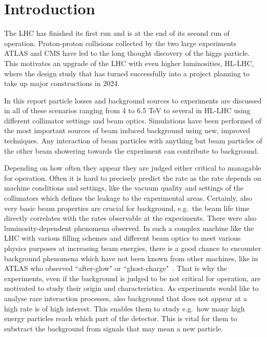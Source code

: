\section{Introduction}


The LHC has finished its first run and is at the end of its second run of operation. Proton-proton collisions collected by the two large experiments ATLAS and CMS have led to the long thought discovery of the higgs particle. This motivates an upgrade of the LHC with even higher luminosities, HL-LHC, where the design study that has turned successfully into a project planning to take up major constructions in 2024.

In this report particle losses and background sources to experiments are discussed in all of these scenarios ranging from 4 to 6.5 TeV to several in HL-LHC using different collimator settings and beam optics. Simulations have been performed of the most important sources of beam induced background using new, improved techniques. Any interaction of beam particles with anything but beam particles of the other beam showering towards the experiment can contribute to background.

Depending on how often they appear they are judged either critical to managable for operation. Often it is hard to precisely predict the rate as the rate depends on machine conditions and settings, like the vacuum quality and settings of the collimators which defines the leakage to the experimental areas. Certainly, also very basic beam properties are crucial for background, e.g.~the beam life time directly correlates with the rates observable at the experiments. There were also luminosity-dependent phenomena observed. In such a complex machine like the LHC with various filling schemes and different beam optics to meet various physics purposes at increasing beam energies, there is a good chance to encounter background phenomena which have not been known from other machines, like in ATLAS who observed ``after-glow" or ``ghost-charge"~\cite{atlasBKGPaper2012}. That is why the experiments, even if the background is judged to be not critical for operation, are motivated to study their origin and characteristica. As experiments would like to analyse rare interaction processes, also background that does not appear at a high rate is of high interest. This enables them to study e.g.~how many high energy particles reach which part of the detector. This is vital for them to substract the background from signals that may mean a new particle. 

